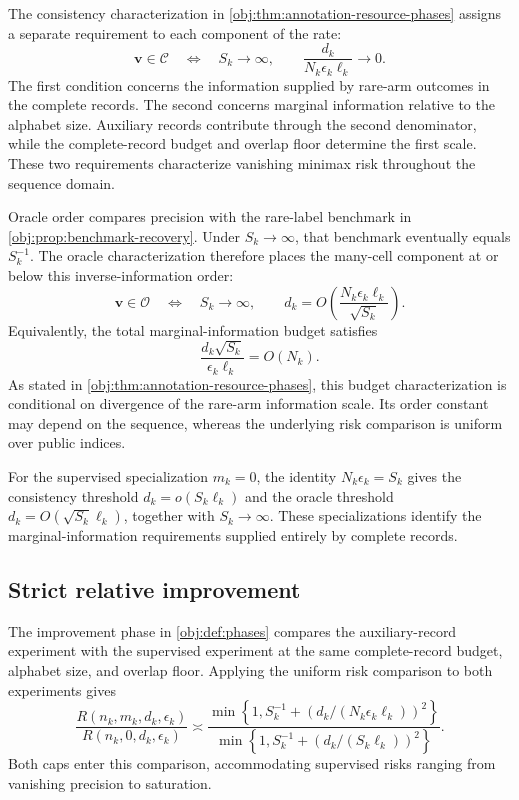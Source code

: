 \documentclass[11pt]{article}
\begin{document}
The consistency characterization in \cref{obj:thm:annotation-resource-phases} assigns a separate requirement to each component of the rate:
\[
\mathbf v\in\mathcal C
\quad\Longleftrightarrow\quad
S_k\longrightarrow\infty,
\qquad
\frac{d_k}{N_k\epsilon_k\ell_k}\longrightarrow0.
\]
The first condition concerns the information supplied by rare-arm outcomes in the complete records. The second concerns marginal information relative to the alphabet size. Auxiliary records contribute through the second denominator, while the complete-record budget and overlap floor determine the first scale. These two requirements characterize vanishing minimax risk throughout the sequence domain.

Oracle order compares precision with the rare-label benchmark in \cref{obj:prop:benchmark-recovery}. Under \(S_k\to\infty\), that benchmark eventually equals \(S_k^{-1}\). The oracle characterization therefore places the many-cell component at or below this inverse-information order:
\[
\mathbf v\in\mathcal O
\quad\Longleftrightarrow\quad
S_k\longrightarrow\infty,
\qquad
d_k=O\left(
\frac{N_k\epsilon_k\ell_k}{\sqrt{S_k}}
\right).
\]
Equivalently, the total marginal-information budget satisfies
\[
\frac{d_k\sqrt{S_k}}{\epsilon_k\ell_k}=O(N_k).
\]
As stated in \cref{obj:thm:annotation-resource-phases}, this budget characterization is conditional on divergence of the rare-arm information scale. Its order constant may depend on the sequence, whereas the underlying risk comparison is uniform over public indices.

For the supervised specialization \(m_k=0\), the identity \(N_k\epsilon_k=S_k\) gives the consistency threshold \(d_k=o(S_k\ell_k)\) and the oracle threshold \(d_k=O(\sqrt{S_k}\ell_k)\), together with \(S_k\to\infty\). These specializations identify the marginal-information requirements supplied entirely by complete records.

\subsection{Strict relative improvement}

The improvement phase in \cref{obj:def:phases} compares the auxiliary-record experiment with the supervised experiment at the same complete-record budget, alphabet size, and overlap floor. Applying the uniform risk comparison to both experiments gives
\[
\frac{R(n_k,m_k,d_k,\epsilon_k)}
     {R(n_k,0,d_k,\epsilon_k)}
\asymp
\frac{
\min\left\{1,S_k^{-1}
+\left(d_k/(N_k\epsilon_k\ell_k)\right)^2\right\}
}{
\min\left\{1,S_k^{-1}
+\left(d_k/(S_k\ell_k)\right)^2\right\}
}.
\]
Both caps enter this comparison, accommodating supervised risks ranging from vanishing precision to saturation.
\end{document}
